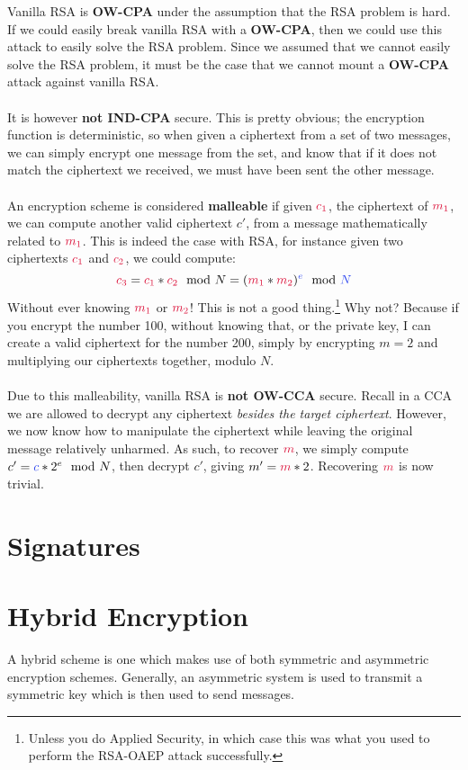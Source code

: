 		Vanilla RSA is \textbf{OW-CPA} under the assumption that the RSA problem is hard. If we could easily break vanilla RSA with a \textbf{OW-CPA}, then we could use this attack to easily solve the RSA problem. Since we assumed that we cannot easily solve the RSA problem, it must be the case that we cannot mount a \textbf{OW-CPA} attack against vanilla RSA.\\
		\\
		It is however \textbf{not IND-CPA} secure. This is pretty obvious; the encryption function is deterministic, so when given a ciphertext from a set of two messages, we can simply encrypt one message from the set, and know that if it does not match the ciphertext we received, we must have been sent the other message.\\
		\\
		An encryption scheme is considered \textbf{malleable} if given $\csubc{1}$, the ciphertext of $\csubm{1}$, we can compute another valid ciphertext $c'$, from a message mathematically related to $\csubm{1}$. This is indeed the case with RSA, for instance given two ciphertexts $\csubc{1}$ and $\csubc{2}$, we could compute:
		$$\csubc{3} = \csubc{1}*\csubc{2} \mod N = (\csubm{1} * \csubm{2})^\ce \mod \cN$$ 
		Without ever knowing $\csubm{1}$ or $\csubm{2}$! This is not a good thing.\footnote{Unless you do Applied Security, in which case this was what you used to perform the RSA-OAEP attack successfully.} Why not? Because if you encrypt the number 100, without knowing that, or the private key, I can create a valid ciphertext for the number 200, simply by encrypting $m = 2$ and multiplying our ciphertexts together, modulo $N$.\\
		\\
		Due to this malleability, vanilla RSA is \textbf{not OW-CCA} secure. Recall in a CCA we are allowed to decrypt any ciphertext \textit{besides the target ciphertext}. However, we now know how to manipulate the ciphertext while leaving the original message relatively unharmed. As such, to recover $\cm$, we simply compute $c' = \cc*2^e \mod N$, then decrypt $c'$, giving $m' = \cm * 2$. Recovering $\cm$ is now trivial.


\section{Signatures}



\section{Hybrid Encryption}
	A hybrid scheme is one which makes use of both symmetric and asymmetric encryption schemes. Generally, an asymmetric system is used to transmit a symmetric key which is then used to send messages.\\


